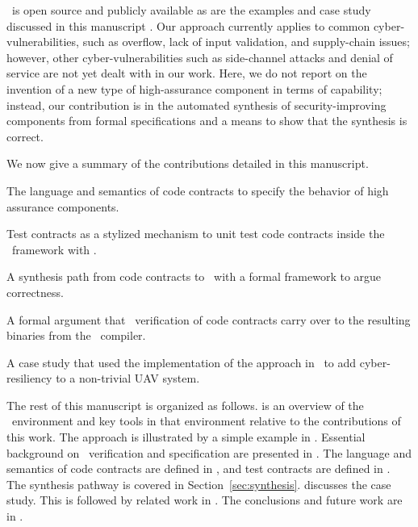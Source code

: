 \brfcs\ is open source and publicly available \cite{fmide} as are the examples and case study discussed in this manuscript \cite{repo, phase2, camkes, case}.
Our approach currently applies to common cyber-vulnerabilities, such
as overflow, lack of input validation, and supply-chain issues; however, other cyber-vulnerabilities such as
side-channel attacks and denial of service are not yet dealt with in
our work.  Here, we do not report on the invention of a new type of
high-assurance component in terms of capability; instead, our contribution
is in the automated synthesis of security-improving components from
formal specifications and a means to show that the synthesis is
correct.

We now give a summary of the contributions detailed in this manuscript.
\begin{compactitem}
  \item The language and semantics of code contracts to specify the behavior of high assurance components.
  \item Test contracts as a stylized mechanism to unit test code contracts inside the \brfcs\ framework with \agr.
  \item A synthesis path from code contracts to \ckml\ with a formal framework to argue correctness.
  \item A formal argument that \agr\ verification of code contracts carry over to the resulting binaries from the \ckml\ compiler.
  \item A case study that used the implementation of the approach in \brfcs\ to add cyber-resiliency to a non-trivial UAV system.
\end{compactitem}
The rest of this manuscript is organized as follows.
 is an overview of the \brfcs\ environment and key tools in that environment relative to the contributions of this work. The approach is illustrated by a simple example in
. Essential background on \agr\ verification and specification are
presented in .
The language and semantics of code contracts are defined in , and test contracts are defined in .
The synthesis pathway is covered in Section~\ref{sec:synthesis}. 
 discusses the case study.
This is followed by related work in . 
The conclusions and future work are in .


